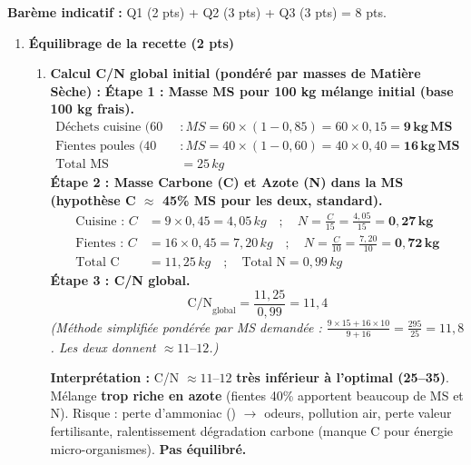 \documentclass[11pt]{article}
\begin{document}
\begin{corrige}
\textbf{Barème indicatif :} Q1 (2 pts) + Q2 (3 pts) + Q3 (3 pts) = 8 pts.

\begin{enumerate}
    \item \textbf{Équilibrage de la recette (2 pts)}
    \begin{enumerate}
        \item \textbf{Calcul C/N global initial (pondéré par masses de Matière Sèche) :}
        \textbf{Étape 1 : Masse MS pour 100 kg mélange initial (base 100 kg frais).}
        \begin{align*}
            \text{Déchets cuisine (60 kg frais)} &: MS = 60 \times (1 - 0,85) = 60 \times 0,15 = \mathbf{9\,kg\,MS} \\
            \text{Fientes poules (40 kg frais)} &: MS = 40 \times (1 - 0,60) = 40 \times 0,40 = \mathbf{16\,kg\,MS} \\
            \text{Total MS} &= 25\,kg
        \end{align*}
        \textbf{Étape 2 : Masse Carbone (C) et Azote (N) dans la MS (hypothèse C $\approx$ 45\% MS pour les deux, standard).}
        \begin{align*}
            \text{Cuisine : } C &= 9 \times 0,45 = 4,05\,kg \quad ; \quad N = \frac{C}{15} = \frac{4,05}{15} = \mathbf{0,27\,kg} \\
            \text{Fientes : } C &= 16 \times 0,45 = 7,20\,kg \quad ; \quad N = \frac{C}{10} = \frac{7,20}{10} = \mathbf{0,72\,kg} \\
            \text{Total C} &= 11,25\,kg \quad ; \quad \text{Total N} = 0,99\,kg
        \end{align*}
        \textbf{Étape 3 : C/N global.}
        \[ \text{C/N}_{\text{global}} = \frac{11,25}{0,99} = \boxed{11,4} \]
        \textit{(Méthode simplifiée pondérée par MS demandée : $\frac{9\times15 + 16\times10}{9+16} = \frac{295}{25} = 11,8$. Les deux donnent $\approx 11\text{--}12$.)}
        
        \textbf{Interprétation :} C/N $\approx 11\text{--}12$ \textbf{très inférieur à l'optimal (25--35)}. Mélange \textbf{trop riche en azote} (fientes 40\% apportent beaucoup de MS et N). Risque : perte d'ammoniac () $\rightarrow$ odeurs, pollution air, perte valeur fertilisante, ralentissement dégradation carbone (manque C pour énergie micro-organismes). \textbf{Pas équilibré.}


\end{enumerate}
\end{enumerate}
\end{corrige}
\end{document}
